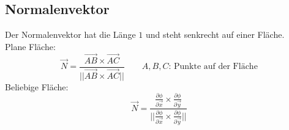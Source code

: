 \subsection{Normalenvektor}
Der Normalenvektor hat die Länge $1$ und steht senkrecht auf einer Fläche. \\
Plane Fläche: 
\[ \boxed{\vec{N} 
= \frac{\overrightarrow{AB} \times \overrightarrow{AC}}
{||\overrightarrow{AB} \times \overrightarrow{AC}||}} 
\qquad \text{$A, B, C$: Punkte auf der Fläche} \]
Beliebige Fläche: 
\[ \boxed{\vec{N} 
= \frac{\frac{\partial \phi}{\partial \vec{x}} 
\times \frac{\partial \phi}{\partial \vec{y}}}
{||\frac{\partial \phi}{\partial \vec{x}} 
\times \frac{\partial \phi}{\partial \vec{y}}||}} \]
